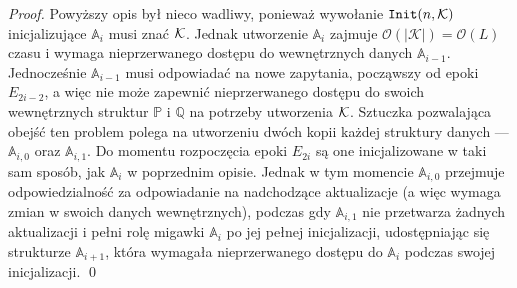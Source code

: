 \documentclass[runningheads]{llncs}
\newcommand{\Oh}{\mathcal{O}}
\begin{document}
\begin{proof}
Powyższy opis był nieco wadliwy, ponieważ wywołanie $\mathtt{Init}(n, \cal K)$ inicjalizujące $\mathbb{A}_{i}$ musi znać $\cal K$. Jednak utworzenie $\mathbb{A}_i$ zajmuje $\Oh(|\mathcal{K}|) = \Oh(L)$ czasu i wymaga nieprzerwanego dostępu do wewnętrznych danych $\mathbb{A}_{i-1}$. Jednocześnie $\mathbb{A}_{i-1}$ musi odpowiadać na nowe zapytania, począwszy od epoki $E_{2i-2}$, a więc nie może zapewnić nieprzerwanego dostępu do swoich wewnętrznych struktur $\mathbb{P}$ i $\mathbb{Q}$ na potrzeby utworzenia $\cal K$. Sztuczka pozwalająca obejść ten problem polega na utworzeniu dwóch kopii każdej struktury danych --- $\mathbb{A}_{i, 0}$ oraz $\mathbb{A}_{i, 1}$. Do momentu rozpoczęcia epoki $E_{2i}$ są one inicjalizowane w taki sam sposób, jak $\mathbb{A}_i$ w poprzednim opisie. Jednak w tym momencie $\mathbb{A}_{i, 0}$ przejmuje odpowiedzialność za odpowiadanie na nadchodzące aktualizacje (a więc wymaga zmian w swoich danych wewnętrznych), podczas gdy $\mathbb{A}_{i, 1}$ nie przetwarza żadnych aktualizacji i pełni rolę migawki $\mathbb{A}_i$ po jej pełnej inicjalizacji, udostępniając się strukturze $\mathbb{A}_{i+1}$, która wymagała nieprzerwanego dostępu do $\mathbb{A}_i$ podczas swojej inicjalizacji.
\qed
\end{proof}

 


\end{document}
